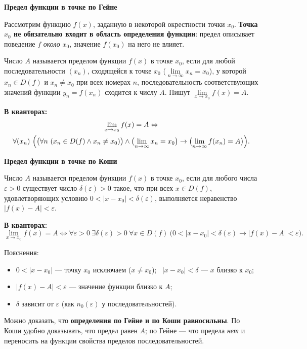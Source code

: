 \documentclass[a4paper,11pt]{article}
\newcommand{\eps}{\varepsilon}
\newcommand{\kv}{\par\noindent\textbf{\textcolor{oprc!85!black}{В кванторах:}}}
\newcommand{\podr}[1]{\par\needspace{8\baselineskip}\medskip
  {\large\bfseries\textcolor{oprc!80!black}{#1}}\par\nopagebreak\smallskip}
\begin{document}
\podr{Предел функции в точке по Гейне}

Рассмотрим функцию $f(x)$, заданную в некоторой окрестности точки $x_0$. \textbf{Точка $x_0$ не обязательно входит в область
определения функции}: предел описывает поведение $f$ \emph{около} $x_0$, значение $f(x_0)$ на него не влияет.

\begin{opr}
Число $A$ называется пределом функции $f(x)$ в точке $x_0$, если для любой последовательности $(x_n)$, сходящейся к точке $x_0$
($\lim\limits_{n \to \infty} x_n = x_0$), у которой $x_n \in D(f)$ и $x_n \ne x_0$ при всех номерах $n$, последовательность
соответствующих значений функции $y_n = f(x_n)$ сходится к числу $A$. Пишут $\lim\limits_{x \to x_0} f(x) = A$.
\kv
\begin{gather*}
  \lim_{x \to x_0} f(x) = A \Leftrightarrow \\
  \forall (x_n)\ \Bigl( \bigl( \forall n\ (x_n \in D(f) \wedge x_n \ne x_0) \bigr)
    \wedge \bigl( \lim_{n \to \infty} x_n = x_0 \bigr)
    \to \bigl( \lim_{n \to \infty} f(x_n) = A \bigr) \Bigr).
\end{gather*}
\end{opr}

\podr{Предел функции в точке по Коши}

\begin{opr}[предел функции по Коши --- на языке $\eps$--$\delta$]
Число $A$ называется пределом функции $f(x)$ в точке $x_0$, если для любого числа $\eps > 0$ существует число $\delta(\eps) > 0$
такое, что при всех $x \in D(f)$, удовлетворяющих условию $0 < |x - x_0| < \delta(\eps)$, выполняется неравенство $|f(x) - A| < \eps$.
\kv
\[
  \lim_{x \to x_0} f(x) = A \Leftrightarrow \forall \eps > 0\ \exists \delta(\eps) > 0\
  \forall x \in D(f)\ \bigl( 0 < |x - x_0| < \delta(\eps) \to |f(x) - A| < \eps \bigr).
\]
\end{opr}

Пояснения:
\begin{itemize}[leftmargin=*]
  \item $0 < |x - x_0|$ --- точку $x_0$ исключаем ($x \ne x_0$); \ $|x - x_0| < \delta$ --- $x$ близко к $x_0$;
  \item $|f(x) - A| < \eps$ --- значение функции близко к $A$;
  \item $\delta$ зависит от $\eps$ (как $n_0(\eps)$ у последовательностей).
\end{itemize}

Можно доказать, что \textbf{определения по Гейне и по Коши равносильны}. По Коши удобно доказывать, что предел равен $A$;
по Гейне --- что предела \emph{нет} и переносить на функции свойства пределов последовательностей.
\end{document}
